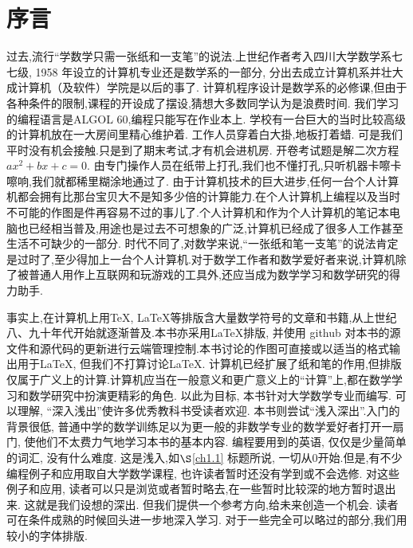 \chapter*{序\quad 言}

\setcounter{page}{1}
\thispagestyle{empty}

过去,流行“学数学只需一张纸和一支笔”的说法.上世纪作者考入四川大学数学系七七级, 1958 年设立的计算机专业还是数学系的一部分,
分出去成立计算机系并壮大成计算机（及软件）学院是以后的事了.
计算机程序设计是数学系的必修课,但由于各种条件的限制,课程的开设成了摆设,猜想大多数同学认为是浪费时间.
我们学习的编程语言是ALGOL 60,编程只能写在作业本上.
学校有一台巨大的当时比较高级的计算机放在一大房间里精心维护着.
工作人员穿着白大掛,地板打着蜡.
可是我们平时没有机会接触.只是到了期末考试,才有机会进机房.
开卷考试题是解二次方程 $ax^2+bx+c = 0$.
由专门操作人员在纸带上打孔,我们也不懂打孔,只听机器卡嚓卡嚓响,我们就都稀里糊涂地通过了.
由于计算机技术的巨大进步,任何一台个人计算机都会拥有比那台宝贝大不是知多少倍的计算能力.在个人计算机上编程以及当时不可能的作图是件再容易不过的事儿了.个人计算机和作为个人计算机的笔记本电脑也已经相当普及,用途也是过去不可想象的广泛,计算机已经成了很多人工作甚至生活不可缺少的一部分.
时代不同了,对数学来说,“一张纸和笔一支笔”的说法肯定是过时了,至少得加上一台个人计算机.对于数学工作者和数学爱好者来说,计算机除了被普通人用作上互联网和玩游戏的工具外,还应当成为数学学习和数学研究的得力助手.

事实上,在计算机上用\TeX,  \LaTeX 等排版含大量数学符号的文章和书籍,从上世纪八、九十年代开始就逐渐普及.本书亦采用\LaTeX 排版, 并使用 github 对本书的源文件和源代码的更新进行云端管理控制.本书讨论的作图可直接或以适当的格式输出用于\LaTeX, 但我们不打算讨论\LaTeX.
计算机已经扩展了纸和笔的作用,但排版仅属于广义上的计算.计算机应当在一般意义和更广意义上的“计算”上,都在数学学习和数学研究中扮演更精彩的角色.
以此为目标, 本书针对大学数学专业而编写.
可以理解, “深入浅出”使许多优秀教科书受读者欢迎. 
本书则尝试“浅入深出”.入门的背景很低,
普通中学的数学训练足以为更一般的非数学专业的数学爱好者打开一扇门, 使他们不太费力气地学习本书的基本内容. 编程要用到的英语, 仅仅是少量简单的词汇, 没有什么难度.
这是浅入,如$\S$\ref{ch1.1} 标题所说, 一切从0开始.但是,有不少编程例子和应用取自大学数学课程, 也许读者暂时还没有学到或不会选修. 对这些例子和应用,
读者可以只是浏览或者暂时略去,在一些暂时比较深的地方暂时退出来.
这就是我们设想的深出.
但我们提供一个参考方向,给未来创造一个机会.
读者可在条件成熟的时候回头进一步地深入学习.
对于一些完全可以略过的部分,我们用较小的字体排版.

